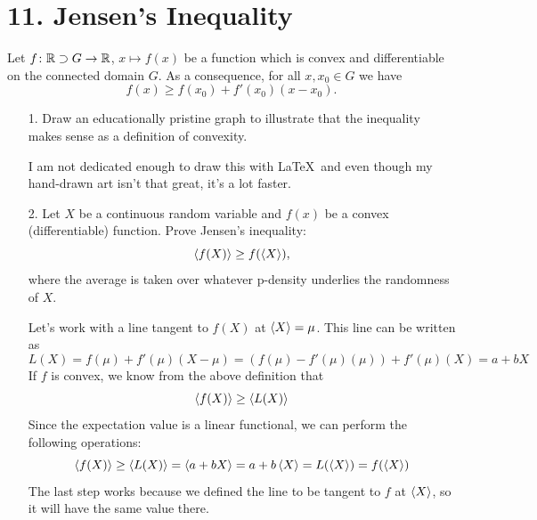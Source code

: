 \documentclass[a4paper,twoside]{article}
\begin{document}
\section*{11. Jensen's Inequality}
Let $ f \colon \mathbb{R} \supset G \to \mathbb{R} $, $ x \mapsto f(x) $ be a function which is convex and differentiable on the connected domain $ G $. As a consequence, for all $ x, x_0 \in G $ we have
\begin{equation}
    f(x) \geq f(x_0) + f'(x_0)(x - x_0).
\end{equation}
\begin{itemize}
    \item[1.] Draw an educationally pristine graph to illustrate that the inequality makes sense as a definition of convexity.
        \begin{problem}
            I am not dedicated enough to draw this with \LaTeX\ and even though my hand-drawn art isn't that great, it's a lot faster.
            \vspace{100mm}
        \end{problem}
    \item[2.] Let $ X $ be a continuous random variable and $ f(x) $ be a convex (differentiable) function. Prove Jensen's inequality:
        \begin{equation}
            \ev{f(X)} \geq f(\ev{X}),
        \end{equation}
        where the average is taken over whatever p-density underlies the randomness of $ X $.
        \begin{problem}
            Let's work with a line tangent to $ f(X) $ at $ \ev{X} = \mu $. This line can be written as
            \begin{equation}
                L(X) = f(\mu) + f'(\mu)(X - \mu) = (f(\mu) - f'(\mu)(\mu)) + f'(\mu)(X) = a + bX
            \end{equation}
            If $ f $ is convex, we know from the above definition that
            \begin{equation}
                \ev{f(X)} \geq \ev{L(X)}
            \end{equation}
            Since the expectation value is a linear functional, we can perform the following operations:
            \begin{equation}
                \ev{f(X)} \geq \ev{L(X)} = \ev{a + bX} = a + b \ev{X} = L(\ev{X}) = f(\ev{X})
            \end{equation}
            The last step works because we defined the line to be tangent to $ f $ at $ \ev{X} $, so it will have the same value there. 
        \end{problem}
\end{itemize}
\end{document}
